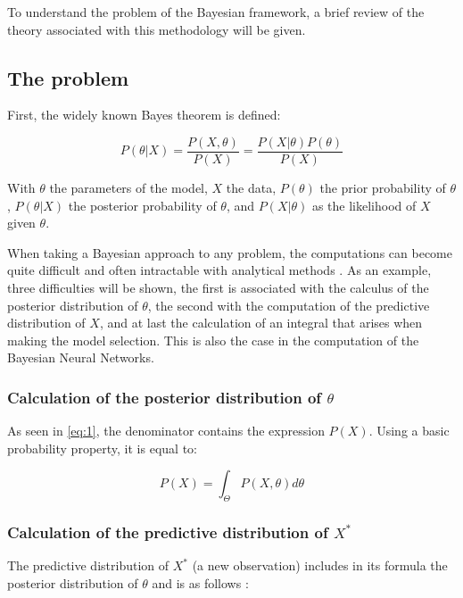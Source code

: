\documentclass{article}
\begin{document}
To understand the problem of the Bayesian framework, a brief review of the theory associated with this methodology will be given. 

\subsection{The problem}
First, the widely known Bayes theorem is defined:

\begin{equation}\label{eq:1}
P(\theta | X ) = \frac{P(X, \theta)}{P(X)} = \frac{P(X|\theta) P(\theta)}{P(X)}
\end{equation}

With $\theta$ the parameters of the model, $X$ the data, $P(\theta)$ the prior probability of $\theta$, $P(\theta | X)$ the posterior probability of $\theta$, and $P(X | \theta)$ as the likelihood of $X$ given $\theta$. 

When taking a Bayesian approach to any problem, the computations can become quite difficult and often intractable with analytical methods \cite{bishop2006pattern}. As an example, three difficulties will be shown, the first is associated with the calculus of the posterior distribution of $\theta$, the second with the computation of the predictive distribution of $X$, and at last the calculation of an integral that arises when making the model selection. This is also the case in the computation of the Bayesian Neural Networks.

\subsubsection{Calculation of the posterior distribution of \texorpdfstring{$\theta$}{Lg}}

As seen in \cref{eq:1}, the denominator contains the expression $P(X)$. Using a basic probability property, it is equal to:

\begin{equation}\label{eq:2}
P(X) = \int_{\Theta} P(X, \theta) d \theta
\end{equation}

\subsubsection{Calculation of the predictive distribution of \texorpdfstring{$X^*$}{Lg}}

The predictive distribution of $X^*$ (a new observation) includes in its formula the posterior distribution of $\theta$ and is as follows \cite{bishop2006pattern}:
\end{document}
